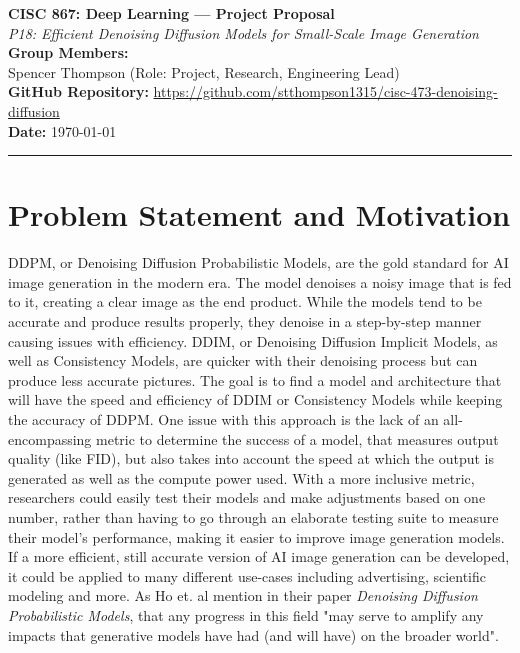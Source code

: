 \documentclass[11pt, letterpaper]{article}
\begin{document}
{\centering
  {\Large\textbf{CISC 867: Deep Learning --- Project Proposal}}\\[0.5em]
  {\large\textit{P18: Efficient Denoising Diffusion Models for Small-Scale Image Generation}}\\[0.4em]
  \textbf{Group Members:}\\{}
  Spencer Thompson  \quad (Role: Project, Research, Engineering Lead)\\{}
  \textbf{GitHub Repository:} \url{https://github.com/stthompson1315/cisc-473-denoising-diffusion}\\[0.3em]
  \textbf{Date:} \today\\[0.4em]
  \rule{\linewidth}{0.4pt}
}

\section{Problem Statement and Motivation}

DDPM, or Denoising Diffusion Probabilistic Models, are the gold standard for AI image generation in the modern era. The model denoises a noisy image that is fed to it, creating a clear image as the end product. While the models tend to be accurate and produce results properly, they denoise in a step-by-step manner causing issues with efficiency. DDIM, or Denoising Diffusion Implicit Models, as well as Consistency Models, are quicker with their denoising process but can produce less accurate pictures. The goal is to find a model and architecture that will have the speed and efficiency of DDIM or Consistency Models while keeping the accuracy of DDPM. One issue with this approach is the lack of an all-encompassing metric to determine the success of a model, that measures output quality (like FID), but also takes into account the speed at which the output is generated as well as the compute power used. With a more inclusive metric, researchers could easily test their models and make adjustments based on one number, rather than having to go through an elaborate testing suite to measure their model's performance, making it easier to improve image generation models. If a more efficient, still accurate version of AI image generation can be developed, it could be applied to many different use-cases including advertising, scientific modeling and more. As Ho et. al mention in their paper \textit{Denoising Diffusion Probabilistic Models}, that any progress in this field "may serve to amplify any impacts that generative models have had (and will have) on the broader world".
\end{document}
